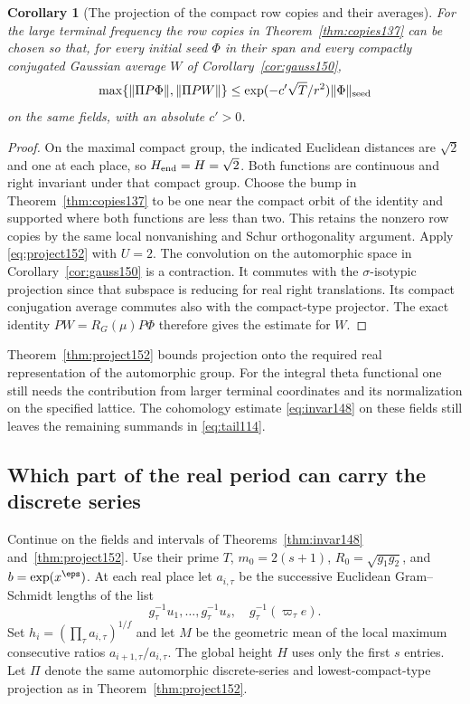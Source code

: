 \documentclass[a4paper,11pt]{article}
\newtheorem{corollary}[proposition]{Corollary}
\theoremstyle{definition}
\theoremstyle{remark}
\numberwithin{equation}{section}
\begin{document}
\begin{corollary}[The projection of the compact row copies and their averages]
\label{cor:compact152}
For the large terminal frequency the row copies in
Theorem~\ref{thm:copies137} can be chosen so that, for every
initial seed \(\Phi\) in their span and every compactly
conjugated Gaussian average \(W\) of Corollary~\ref{cor:gauss150},
\[
     \max\{\|\Pi P\Phi\|,\|\Pi PW\|\}
             \le \exp(-c'\sqrt T/r^2)\|\Phi\|_{\rm seed}
\]
on the same fields, with an absolute \(c'>0\).
\end{corollary}
\begin{proof}
On the maximal compact group, the indicated Euclidean
distances are \(\sqrt2\) and one at each place, so
\(H_{\rm end}=H=\sqrt2\). Both functions are continuous
and right invariant under that compact group. Choose the bump
in Theorem~\ref{thm:copies137} to be one near the compact
orbit of the identity and supported where both functions are
less than two. This retains the nonzero row copies by the
same local nonvanishing and Schur orthogonality argument.
Apply \eqref{eq:project152} with \(U=2\). The convolution on
the automorphic space in Corollary~\ref{cor:gauss150} is a
contraction. It commutes with the \(\sigma\)-isotypic projection
since that subspace is reducing for real right translations.
Its compact conjugation average commutes also with the
compact-type projector. The exact identity
\(PW=R_G(\mu)P\Phi\) therefore gives the estimate for \(W\).
\end{proof}

Theorem~\ref{thm:project152} bounds projection onto the
required real representation of the automorphic group.
For the integral theta functional one still needs the
contribution from larger terminal coordinates and its
normalization on the specified lattice. The cohomology
estimate \eqref{eq:invar148} on these fields still leaves
the remaining summands in \eqref{eq:tail114}.

\subsection{Which part of the real period can carry the discrete series}\label{nav:VII-24}
Continue on the fields and intervals of
Theorems~\ref{thm:invar148} and~\ref{thm:project152}. Use
their prime \(T\), \(m_0=2(s+1)\), \(R_0=\sqrt{g_1g_2}\),
and \(b=\exp(x^\eps)\). At each real place let \(a_{i,\tau}\)
be the successive Euclidean Gram--Schmidt lengths of the list
\[
 g_\tau^{-1}u_1,\ldots,g_\tau^{-1}u_s,\quad
 g_\tau^{-1}(\varpi_\tau e).
\]
Set \(h_i=(\prod_\tau a_{i,\tau})^{1/f}\) and let \(M\) be
the geometric mean of the local maximum consecutive ratios
\(a_{i+1,\tau}/a_{i,\tau}\). The global height \(H\) uses
only the first \(s\) entries. Let \(\Pi\) denote the same
automorphic discrete-series and lowest-compact-type projection
as in Theorem~\ref{thm:project152}.
\end{document}
